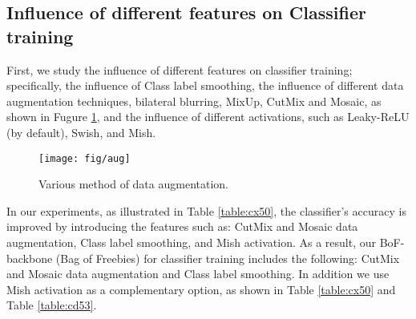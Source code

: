 \documentclass[10pt,twocolumn,letterpaper]{article}
\begin{document}
\subsection{Influence of different features on Classifier training}

First, we study the influence of different features on classifier training; specifically, the influence of Class label smoothing, the influence of different data augmentation techniques, bilateral blurring, MixUp, CutMix and Mosaic, as shown in Fugure \ref{fig:aug}, and the influence of different activations, such as Leaky-ReLU (by default), Swish, and Mish.

\begin{figure}[h]
	\begin{center}
		\texttt{[image: fig/aug]}
	\end{center}
	\caption{Various method of data augmentation.  }
	\label{fig:aug}
\end{figure}

In our experiments, as illustrated in Table \ref{table:cx50}, the classifier's accuracy is improved by introducing the features such as: CutMix and Mosaic data augmentation, Class label smoothing, and Mish activation. As a result, our BoF-backbone (Bag of Freebies) for classifier training includes the following: CutMix and Mosaic data augmentation and Class label smoothing. In addition we use Mish activation as a complementary option, as shown in Table \ref{table:cx50} and Table \ref{table:cd53}.
\end{document}

